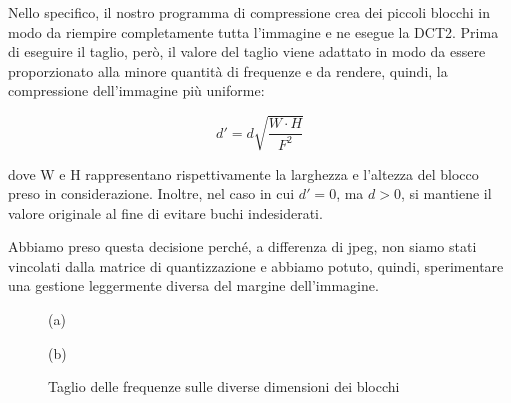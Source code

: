Nello specifico, il nostro programma di compressione crea dei piccoli blocchi in modo da riempire completamente tutta l'immagine e ne esegue la DCT2. Prima di eseguire il taglio, però, il valore del taglio viene adattato in modo da essere proporzionato alla minore quantità di frequenze e da rendere, quindi, la compressione dell'immagine più uniforme:

$$d' = d  \sqrt{ \frac{W \cdot H}{F^{2}}}$$

dove W e H rappresentano rispettivamente la larghezza e l'altezza del blocco preso in considerazione.
Inoltre, nel caso in cui $d'=0$, ma $d>0$, si mantiene il valore originale al fine di evitare buchi indesiderati.

Abbiamo preso questa decisione perché, a differenza di jpeg, non siamo stati vincolati dalla matrice di quantizzazione e abbiamo potuto, quindi, sperimentare una gestione leggermente diversa del margine dell'immagine.


\begin{figure}
	\begin{minipage}{0.5\textwidth}
		\begin{center}
		
		\end{center}
		\begin{center}
			(a)
		\end{center}
	\end{minipage}\hfill
	\begin{minipage}{0.5\textwidth}
		\begin{center}
		\end{center}
	\begin{center}
		(b)
	\end{center}
\end{minipage}
\caption{Taglio delle frequenze sulle diverse dimensioni dei blocchi}\label{fig:taglio}
\end{figure}


